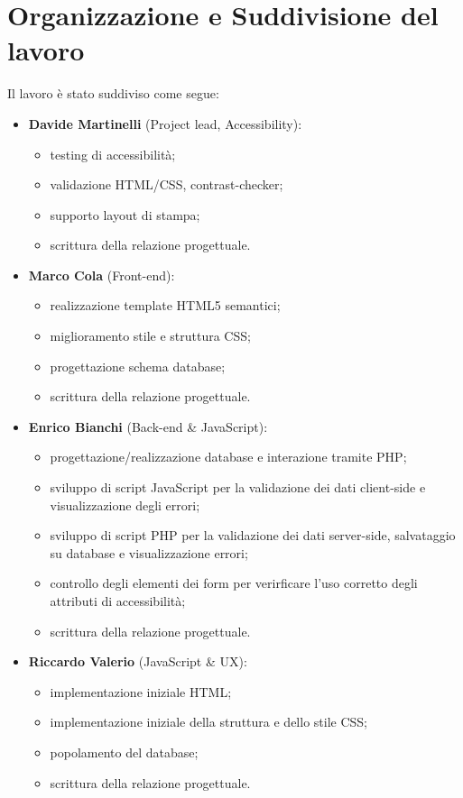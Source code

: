 \documentclass{article}
\begin{document}
\section{Organizzazione e Suddivisione del lavoro}
Il lavoro è stato suddiviso come segue:
\begin{itemize}
    \item \textbf{Davide Martinelli} (Project lead, Accessibility):
            \begin{itemize}
                \item testing di accessibilità;
                \item validazione HTML/CSS, contrast-checker;
                \item supporto layout di stampa;
                \item scrittura della relazione progettuale.
            \end{itemize}
    \item \textbf{Marco Cola} (Front-end):
            \begin{itemize}
                \item realizzazione template HTML5 semantici;
                \item miglioramento stile e struttura CSS;
                \item progettazione schema database;
                \item scrittura della relazione progettuale.
            \end{itemize}
    \item \textbf{Enrico Bianchi} (Back-end \& JavaScript):
            \begin{itemize}
                \item progettazione/realizzazione database e interazione tramite PHP;
                \item sviluppo di script JavaScript per la validazione dei dati client-side e visualizzazione degli errori;
                \item sviluppo di script PHP per la validazione dei dati server-side, salvataggio su database e visualizzazione errori;
                \item controllo degli elementi dei form per verirficare l’uso corretto degli attributi di accessibilità;
                \item scrittura della relazione progettuale.
            \end{itemize}
   \item \textbf{Riccardo Valerio} (JavaScript \& UX):
            \begin{itemize}
                \item implementazione iniziale HTML;
                \item implementazione iniziale della struttura e dello stile CSS;
                \item popolamento del database;
                \item scrittura della relazione progettuale.
            \end{itemize}
\end{itemize}
\end{document}

